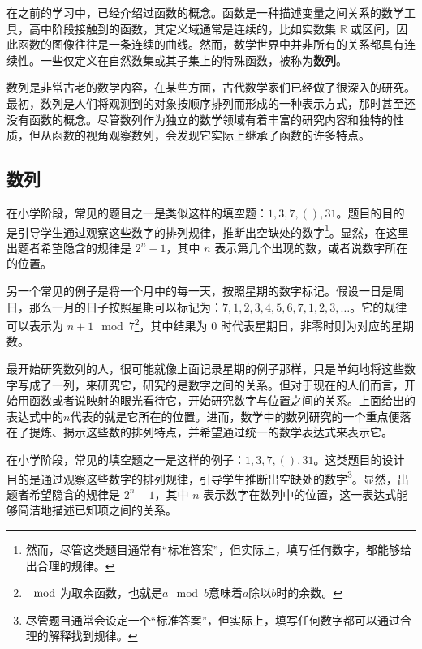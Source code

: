 
\begin{issues}
\issueDraft
\end{issues}

在之前的学习中，已经介绍过函数的概念。函数是一种描述变量之间关系的数学工具，高中阶段接触到的函数，其定义域通常是连续的，比如实数集 $\mathbb{R}$ 或区间，因此函数的图像往往是一条连续的曲线。然而，数学世界中并非所有的关系都具有连续性。一些仅定义在自然数集或其子集上的特殊函数，被称为\textbf{数列}。

数列是非常古老的数学内容，在某些方面，古代数学家们已经做了很深入的研究。最初，数列是人们将观测到的对象按顺序排列而形成的一种表示方式，那时甚至还没有函数的概念。尽管数列作为独立的数学领域有着丰富的研究内容和独特的性质，但从函数的视角观察数列，会发现它实际上继承了函数的许多特点。

\subsection{数列}

在小学阶段，常见的题目之一是类似这样的填空题：$1,3,7,(),31$。题目的目的是引导学生通过观察这些数字的排列规律，推断出空缺处的数字\footnote{然而，尽管这类题目通常有“标准答案”，但实际上，填写任何数字，都能够给出合理的规律。}。显然，在这里出题者希望隐含的规律是 $2^n - 1$，其中 $n$ 表示第几个出现的数，或者说数字所在的位置。

另一个常见的例子是将一个月中的每一天，按照星期的数字标记。假设一日是周日，那么一月的日子按照星期可以标记为：$7,1, 2, 3, 4, 5, 6, 7, 1, 2, 3, \dots$。它的规律可以表示为 $n+1 \mod 7$\footnote{$\mod$为取余函数，也就是$a\mod b$意味着$a$除以$b$时的余数。}，其中结果为 $0$ 时代表星期日，非零时则为对应的星期数。

最开始研究数列的人，很可能就像上面记录星期的例子那样，只是单纯地将这些数字写成了一列，来研究它，研究的是数字之间的关系。但对于现在的人们而言，开始用函数或者说映射的眼光看待它，开始研究数字与位置之间的关系。上面给出的表达式中的$n$代表的就是它所在的位置。进而，数学中的数列研究的一个重点便落在了提炼、揭示这些数的排列特点，并希望通过统一的数学表达式来表示它。

在小学阶段，常见的填空题之一是这样的例子：$1,3,7,(),31$。这类题目的设计目的是通过观察这些数字的排列规律，引导学生推断出空缺处的数字\footnote{尽管题目通常会设定一个“标准答案”，但实际上，填写任何数字都可以通过合理的解释找到规律。}。显然，出题者希望隐含的规律是 $2^n - 1$，其中 $n$ 表示数字在数列中的位置，这一表达式能够简洁地描述已知项之间的关系。

